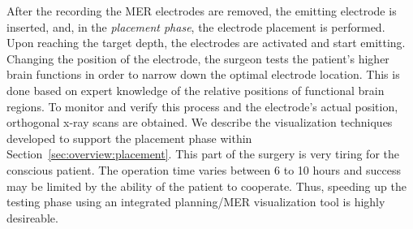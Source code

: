 \documentclass{vgtc}                          %
\begin{document}
After the recording the MER electrodes are removed, the emitting electrode is inserted, and, in the \emph{placement phase},  the electrode placement is performed. Upon reaching the target depth, the electrodes are activated and start emitting. Changing the position of the electrode, the surgeon tests the patient's higher brain functions in order to narrow down the optimal electrode location. This is done based on expert knowledge of the relative positions of functional brain regions. To monitor and verify this process and the electrode's actual position, orthogonal x-ray scans are obtained. We describe the visualization techniques developed to support the placement phase within Section~\ref{sec:overview:placement}. This part of the surgery is very tiring for the conscious patient.  The operation time varies between 6 to 10 hours and success may be limited by the ability of the patient to cooperate. Thus, speeding up the testing phase using an integrated planning/MER visualization tool is highly desireable.

\end{document}
